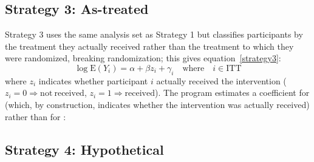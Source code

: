 \begin{minipage}{\linewidth}
\begin{stlog}
\nullskip
\end{stlog}
\end{minipage}

\subsection{Strategy 3: As-treated}

Strategy 3 uses the same analysis set as Strategy 1 but classifies
participants by the treatment they actually received rather than the
treatment to which they were randomized, breaking randomization; this
gives equation~\eqref{strategy3}:
%
\begin{equation}\label{strategy3}
  \log \mathrm{E}(Y_i) = \alpha + \beta z_i + \gamma_i \quad \mathrm{where}\quad i \in \mathrm{ITT}
\end{equation}
%
where $z_i$ indicates whether participant $i$ actually received the
intervention ($z_i\!=\!0\!\Rightarrow\!\mathrm{not~received}$,
$z_i\!=\!1\!\Rightarrow\!\mathrm{received}$). The program
 estimates a coefficient for
 (which, by construction, indicates whether the
intervention was actually received) rather than for :

\begin{minipage}{\linewidth}
\begin{stlog}
\nullskip
\end{stlog}
\end{minipage}

\subsection{Strategy 4: Hypothetical}\label{sec:strategy4}

